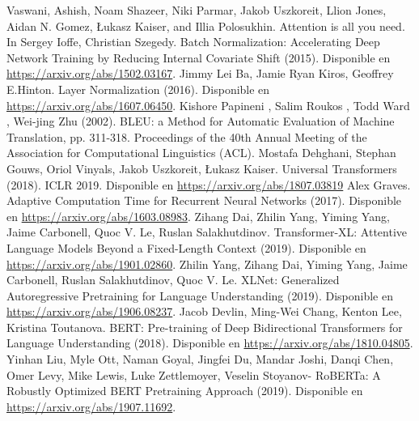 \documentclass[conference]{IEEEtran}
\begin{document}
\begin{thebibliography}{00}

 Vaswani, Ashish, Noam Shazeer, Niki Parmar, Jakob Uszkoreit, Llion Jones, Aidan N. Gomez, Łukasz Kaiser, and Illia Polosukhin. Attention is all you need. In 
Sergey Ioffe, Christian Szegedy. Batch Normalization: Accelerating Deep Network Training by Reducing Internal Covariate Shift (2015). Disponible en \href{https://arxiv.org/abs/1502.03167}{https://arxiv.org/abs/1502.03167}.
 Jimmy Lei Ba, Jamie Ryan Kiros, Geoffrey E.Hinton. Layer Normalization (2016). Disponible en \href{https://arxiv.org/abs/1607.06450}{https://arxiv.org/abs/1607.06450}.
Kishore Papineni , Salim Roukos , Todd Ward , Wei-jing Zhu (2002). BLEU: a Method for Automatic Evaluation of Machine Translation,  pp. 311-318. Proceedings of the 40th Annual Meeting of the Association for Computational Linguistics (ACL). 
Mostafa Dehghani, Stephan Gouws, Oriol Vinyals, Jakob Uszkoreit, Łukasz Kaiser. Universal Transformers (2018). ICLR 2019. Disponible en \href{https://arxiv.org/abs/1807.03819}{https://arxiv.org/abs/1807.03819}
Alex Graves. Adaptive Computation Time for Recurrent Neural Networks (2017). Disponible en \href{https://arxiv.org/abs/1603.08983}{https://arxiv.org/abs/1603.08983}.
Zihang Dai, Zhilin Yang, Yiming Yang, Jaime Carbonell, Quoc V. Le, Ruslan Salakhutdinov. Transformer-XL: Attentive Language Models Beyond a Fixed-Length Context (2019). Disponible en \href{https://arxiv.org/abs/1901.02860}{https://arxiv.org/abs/1901.02860}. 
Zhilin Yang, Zihang Dai, Yiming Yang, Jaime Carbonell, Ruslan Salakhutdinov, Quoc V. Le. XLNet: Generalized Autoregressive Pretraining for Language Understanding (2019). Disponible en \href{https://arxiv.org/abs/1906.08237}{https://arxiv.org/abs/1906.08237}.
Jacob Devlin, Ming-Wei Chang, Kenton Lee, Kristina Toutanova. BERT: Pre-training of Deep Bidirectional Transformers for Language Understanding (2018). Disponible en \href{https://arxiv.org/abs/1810.04805}{https://arxiv.org/abs/1810.04805}.
Yinhan Liu, Myle Ott, Naman Goyal, Jingfei Du, Mandar Joshi, Danqi Chen, Omer Levy, Mike Lewis, Luke Zettlemoyer, Veselin Stoyanov- RoBERTa: A Robustly Optimized BERT Pretraining Approach (2019). Disponible en \href{https://arxiv.org/abs/1907.11692}{https://arxiv.org/abs/1907.11692}.

\end{thebibliography}
\end{document}
